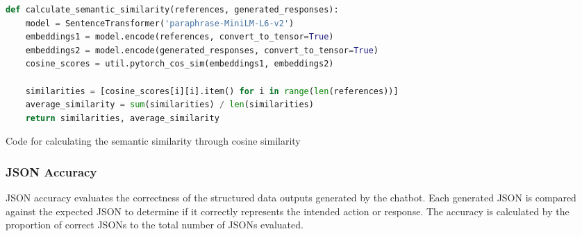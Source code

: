 \begin{Listing}
    \begin{lstlisting}[language=Python]
def calculate_semantic_similarity(references, generated_responses):
    model = SentenceTransformer('paraphrase-MiniLM-L6-v2')
    embeddings1 = model.encode(references, convert_to_tensor=True)
    embeddings2 = model.encode(generated_responses, convert_to_tensor=True)
    cosine_scores = util.pytorch_cos_sim(embeddings1, embeddings2)

    similarities = [cosine_scores[i][i].item() for i in range(len(references))]
    average_similarity = sum(similarities) / len(similarities)
    return similarities, average_similarity
  \end{lstlisting}
    \caption{Code for calculating the semantic similarity through cosine similarity}
    \label{lst:similarity}
\end{Listing}


\subsubsection{JSON Accuracy}

JSON accuracy evaluates the correctness of the structured data outputs generated by the chatbot. Each generated JSON is compared against the expected JSON to determine if it correctly represents the intended action or response. The accuracy is calculated by the proportion of correct JSONs to the total number of JSONs evaluated.

